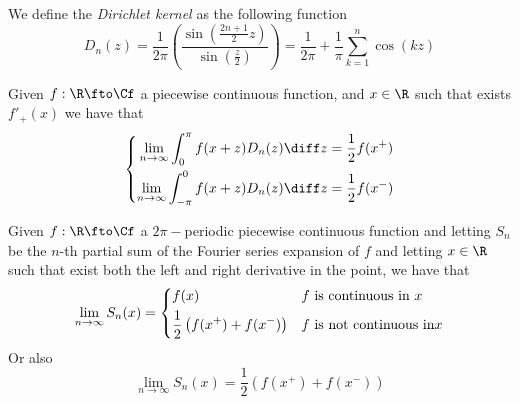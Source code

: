 \documentclass[../mmf.tex]{subfiles}
\begin{document}
\begin{dfn}
	We define the \textit{Dirichlet kernel} as the following function
	\begin{equation*}
		D_n(z)=\frac{1}{2\pi}\left( \frac{\sin\left( \frac{2n+1}{2}z \right)}{\sin\left( \frac{z}{2} \right)} \right)=\frac{1}{2\pi}+\frac{1}{\pi}\sum_{k=1}^n\cos(kz)
	\end{equation*}
\end{dfn}
\begin{lem}
	Given $f:\R\fto\Cf$ a piecewise continuous function, and $x\in\R$ such that exists $f'_+(x)$ we have that
	\begin{equation*}
		\left\{ \begin{aligned}
				\lim_{n\to\infty}\int_{0}^{\pi}f(x+z)D_n(z)\diff z&=\frac{1}{2}f(x^+)\\
				\lim_{n\to\infty}\int_{-\pi}^{0}f(x+z)D_n(z)\diff z&=\frac{1}{2}f(x^-)
		\end{aligned}\right.
	\end{equation*}
\end{lem}
\begin{thm}
	Given $f:\R\fto\Cf$ a $2\pi-$periodic piecewise continuous function and letting $S_n$ be the $n$-th partial sum of the Fourier series expansion of $f$ and letting $x\in\R$ such that exist both the left and right derivative in the point, we have that
	\begin{equation*}
		\lim_{n\to\infty}S_n(x)=\begin{dcases}f(x)&f\text{ is continuous in }x\\\frac{1}{2}\left( f(x^+)+f(x^-) \right)&f\text{ is not continuous in}x\end{dcases}
	\end{equation*}
	Or also
	\begin{equation*}
		\lim_{n\to\infty}S_n(x)=\frac{1}{2}\left( f(x^+)+f(x^-) \right)
	\end{equation*}
\end{thm}
\end{document}
